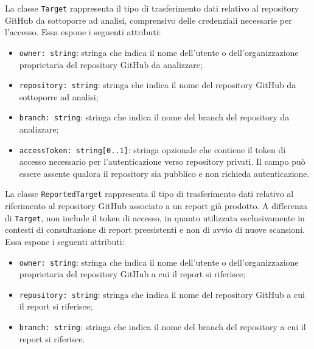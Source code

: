 \documentclass[a4paper, 11pt]{article}
\newcounter{subsubsubsection}[subsubsection]
\begin{document}
 
\label{sec:Target}
 
La classe \texttt{Target} rappresenta il tipo di trasferimento dati relativo al repository GitHub
da sottoporre ad analisi, comprensivo delle credenziali necessarie per l'accesso. Essa espone i
seguenti attributi:
 
\begin{itemize}
  \item \texttt{owner: string}: stringa che indica il nome dell'utente o dell'organizzazione
    proprietaria del repository GitHub da analizzare;
 
  \item \texttt{repository: string}: stringa che indica il nome del repository GitHub da
    sottoporre ad analisi;
 
  \item \texttt{branch: string}: stringa che indica il nome del branch del repository da
    analizzare;
 
  \item \texttt{accessToken: string[0..1]}: stringa opzionale che contiene il token di accesso
    necessario per l'autenticazione verso repository privati. Il campo può essere assente qualora
    il repository sia pubblico e non richieda autenticazione.
\end{itemize}
 
\label{sec:ReportedTarget}
 
La classe \texttt{ReportedTarget} rappresenta il tipo di trasferimento dati relativo al riferimento
al repository GitHub associato a un report già prodotto. A differenza di \texttt{Target}, non
include il token di accesso, in quanto utilizzata esclusivamente in contesti di consultazione di
report preesistenti e non di avvio di nuove scansioni. Essa espone i seguenti attributi:
 
\begin{itemize}
  \item \texttt{owner: string}: stringa che indica il nome dell'utente o dell'organizzazione
    proprietaria del repository GitHub a cui il report si riferisce;
 
  \item \texttt{repository: string}: stringa che indica il nome del repository GitHub a cui il
    report si riferisce;
 
  \item \texttt{branch: string}: stringa che indica il nome del branch del repository a cui il
    report si riferisce.
\end{itemize}
\label{sec:WorkflowState}
\end{document}
